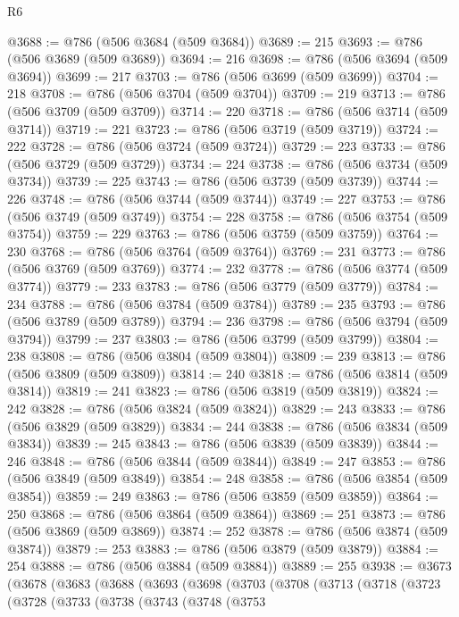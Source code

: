 \begin{lexlean}{R6}
\begin{coremodule}
@3688 := @786 (@506 @3684 (@509 @3684))
@3689 := 215
@3693 := @786 (@506 @3689 (@509 @3689))
@3694 := 216
@3698 := @786 (@506 @3694 (@509 @3694))
@3699 := 217
@3703 := @786 (@506 @3699 (@509 @3699))
@3704 := 218
@3708 := @786 (@506 @3704 (@509 @3704))
@3709 := 219
@3713 := @786 (@506 @3709 (@509 @3709))
@3714 := 220
@3718 := @786 (@506 @3714 (@509 @3714))
@3719 := 221
@3723 := @786 (@506 @3719 (@509 @3719))
@3724 := 222
@3728 := @786 (@506 @3724 (@509 @3724))
@3729 := 223
@3733 := @786 (@506 @3729 (@509 @3729))
@3734 := 224
@3738 := @786 (@506 @3734 (@509 @3734))
@3739 := 225
@3743 := @786 (@506 @3739 (@509 @3739))
@3744 := 226
@3748 := @786 (@506 @3744 (@509 @3744))
@3749 := 227
@3753 := @786 (@506 @3749 (@509 @3749))
@3754 := 228
@3758 := @786 (@506 @3754 (@509 @3754))
@3759 := 229
@3763 := @786 (@506 @3759 (@509 @3759))
@3764 := 230
@3768 := @786 (@506 @3764 (@509 @3764))
@3769 := 231
@3773 := @786 (@506 @3769 (@509 @3769))
@3774 := 232
@3778 := @786 (@506 @3774 (@509 @3774))
@3779 := 233
@3783 := @786 (@506 @3779 (@509 @3779))
@3784 := 234
@3788 := @786 (@506 @3784 (@509 @3784))
@3789 := 235
@3793 := @786 (@506 @3789 (@509 @3789))
@3794 := 236
@3798 := @786 (@506 @3794 (@509 @3794))
@3799 := 237
@3803 := @786 (@506 @3799 (@509 @3799))
@3804 := 238
@3808 := @786 (@506 @3804 (@509 @3804))
@3809 := 239
@3813 := @786 (@506 @3809 (@509 @3809))
@3814 := 240
@3818 := @786 (@506 @3814 (@509 @3814))
@3819 := 241
@3823 := @786 (@506 @3819 (@509 @3819))
@3824 := 242
@3828 := @786 (@506 @3824 (@509 @3824))
@3829 := 243
@3833 := @786 (@506 @3829 (@509 @3829))
@3834 := 244
@3838 := @786 (@506 @3834 (@509 @3834))
@3839 := 245
@3843 := @786 (@506 @3839 (@509 @3839))
@3844 := 246
@3848 := @786 (@506 @3844 (@509 @3844))
@3849 := 247
@3853 := @786 (@506 @3849 (@509 @3849))
@3854 := 248
@3858 := @786 (@506 @3854 (@509 @3854))
@3859 := 249
@3863 := @786 (@506 @3859 (@509 @3859))
@3864 := 250
@3868 := @786 (@506 @3864 (@509 @3864))
@3869 := 251
@3873 := @786 (@506 @3869 (@509 @3869))
@3874 := 252
@3878 := @786 (@506 @3874 (@509 @3874))
@3879 := 253
@3883 := @786 (@506 @3879 (@509 @3879))
@3884 := 254
@3888 := @786 (@506 @3884 (@509 @3884))
@3889 := 255
@3938 := @3673
    (@3678
      (@3683
        (@3688
          (@3693
            (@3698
              (@3703
                (@3708
                  (@3713
                    (@3718
                      (@3723
                        (@3728
                          (@3733
                            (@3738
                              (@3743
                                (@3748
                                  (@3753

\end{coremodule}
\end{lexlean}

